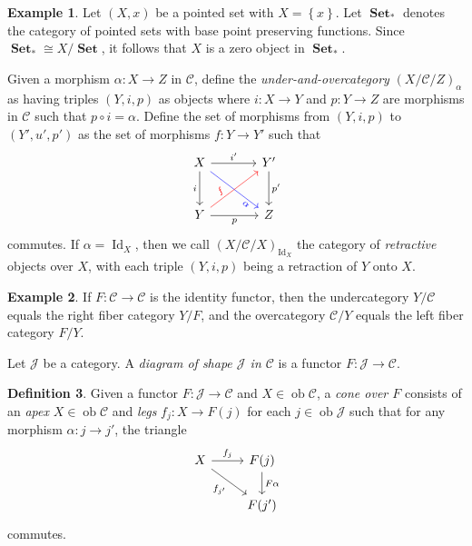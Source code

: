 \documentclass[10pt,letterpaper,cm]{nupset}
\theoremstyle{definition}
\newtheorem{definition}{Definition}[section]
\newtheorem{exmp}[definition]{Example}
\theoremstyle{theorem}
\theoremstyle{remark}
\newcommand{\1}{\mathbf{1}}
\renewcommand{\c}{\mathscr{C}}
\renewcommand{\j}{\mathscr{J}}
\newcommand{\0}{\vec 0}
\DeclareMathOperator{\id}{Id}
\DeclareMathOperator{\ob}{ob}
\DeclareMathOperator{\set}{\mathbf{Set}}
\begin{document}
\begin{exmp}
Let $\left(X, x\right)$ be a pointed set with $X= \left\{x\right\}$. Let $\set_{\ast}$ denotes the category of pointed sets with base point preserving functions. Since  $\set_{\ast} \cong {X}/{\set}$, it follows that $X$ is a zero object in $\set_{\ast}$.
\end{exmp}

\smallskip

Given a morphism $\alpha : X \to Z$ in $\c$, define the \textit{under-and-overcategory} $\left(X/\c/Z\right)_{\alpha}$ as having triples $\left(Y, i, p\right)$ as objects where $i : X \to Y$ and $p: Y \to Z$ are morphisms in $\c$ such that $p\circ i = \alpha$. Define the set of morphisms from $\left(Y, i, p\right)$ to $\left(Y', u', p'\right)$ as the set of morphisms $f: Y \to Y'$ such that 
\[
\begin{tikzcd}[row sep=large, column sep=large]
X \arrow[to=Z, "i ", swap] \arrow[to=2-2, dr, blue, sloped,pos=.8, "\alpha", swap]
& Y' \arrow[to=2-2, "p' "] \\
|[alias=Z]| Y \arrow[to=1-2, ur, red, sloped,pos=.3, "f"] \arrow[to=2-2, "p"'] 
& Z
\arrow[from=ul, to=1-2, "i' "]
\end{tikzcd}
\]
commutes. If $\alpha = \id_X$, then we call $\left(X/\c/X\right)_{\id_X}$ the category of \textit{retractive} objects over $X$, with each triple $\left(Y, i, p\right)$ being a retraction of $Y$ onto $X$.


\begin{exmp}
If $F: \c \to \c$ is the identity functor, then the undercategory $Y/\c$ equals the right fiber category $Y/F$, and the overcategory $\c/Y$ equals the left fiber category $F/Y$.
\end{exmp}

\medskip


Let $\j$ be a category. A \textit{diagram of shape $\j$ in $\c$} is a functor $F: \j \to \c$.


\begin{definition}
Given a functor $F: \j \to \c$ and $X \in \ob \c$, a \textit{cone over $F$} consists of an \textit{apex} $X\in \ob \c$ and \textit{legs} $f_j : X \to F(j)$ for each $j \in \ob \j$ such that for any morphism $\alpha : j \to j'$, the triangle
\[ \begin{tikzcd}
X \arrow[r, "f_j"] \arrow[swap, dr,  " f_{j'} "] & F(j) \arrow[d, "F\alpha"] \\
 & F(j')
\end{tikzcd}
\]
commutes.
\end{definition}
\end{document}
